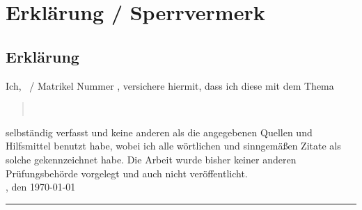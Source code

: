 \setlength{\parindent}{0pt}

\chapter*{Erkl\"arung / Sperrvermerk}
\label{cha:erklaerung_sperrvermerk}


\section*{Erkl\"arung}
\label{sec:erklaerung}

Ich, \autor\ / Matrikel Nummer \matrikelnr, versichere hiermit, dass ich diese \art{} mit dem Thema
\begin{quote}
\centering
\large{\textit{\titel}}\\
\normalsize{\textit{\untertitel}}
\end{quote}
selbst\"andig verfasst und keine anderen als die angegebenen Quellen und Hilfsmittel benutzt habe, wobei ich alle w\"ortlichen und sinngem\"a\ss{}en Zitate als solche gekennzeichnet habe. Die Arbeit wurde bisher keiner anderen Pr\"ufungsbeh\"orde vorgelegt und auch nicht ver\"offentlicht.\\[1ex]

\ort, den \today \\[1ex]

\rule[-0.2cm]{7cm}{0.5pt}\\
\small{\textit{\autor}} \\[1ex]
\setlength{\parindent}{15pt}
